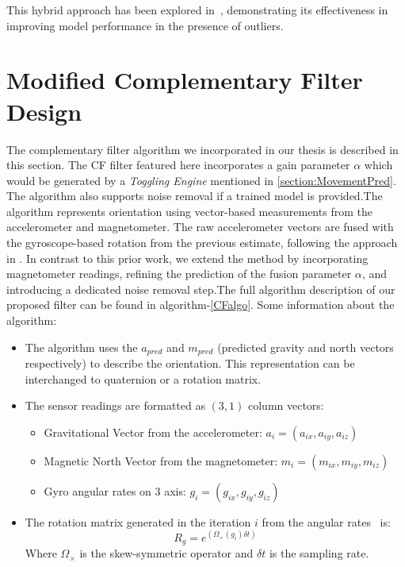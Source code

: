 \documentclass{iutbscthesis}
\begin{document}
This hybrid approach has been explored in~\cite{lopez2017ransac}, demonstrating its effectiveness in improving model performance in the presence of outliers.
    

\section{Modified Complementary Filter Design}
    The complementary filter algorithm we incorporated in our thesis is described in this section. The CF filter featured here incorporates a gain parameter $\alpha$ which would be generated by a \textit{Toggling Engine} mentioned in \autoref{section:MovementPred}. The algorithm also supports noise removal if a trained model is provided\cite{denoising}.The algorithm represents orientation using vector-based measurements from the accelerometer and magnetometer. The raw accelerometer vectors are fused with the gyroscope-based rotation from the previous estimate, following the approach in \cite{vertzberger2022adaptive}. In contrast to this prior work, we extend the method by incorporating magnetometer readings, refining the prediction of the fusion parameter $\alpha$, and introducing a dedicated noise removal step.The full algorithm description of our proposed filter can be found in algorithm-\ref{CFalgo}. Some information about the algorithm:
    \begin{itemize}
    \item The algorithm uses the $a_{pred}$ and $m_{pred}$ (predicted gravity and north vectors respectively) to describe the orientation. This representation can be interchanged to quaternion or a rotation matrix\cite{black1964passive}\cite{cariow2016hardware}.
    \item The sensor readings are formatted as $(3,1)$ column vectors:
    \begin{itemize}
        \item Gravitational Vector from the accelerometer: $a_i = (a_{ix},a_{iy},a_{iz})$
        \item Magnetic North Vector from the magnetometer: $m_i = (m_{ix},m_{iy},m_{iz})$
        \item Gyro angular rates on 3 axis: $g_i = (g_{ix},g_{iy},g_{iz})$
    \end{itemize}
    \item  The rotation matrix generated in the iteration $i$ from the angular rates~\cite{zhao2016time} is:
    \begin{equation}
        R_g = e^{(\Omega_{\times}(g_i)\delta t)}
    \end{equation}
    Where $\Omega_{\times}$ is the skew-symmetric operator and $\delta t$ is the sampling rate.
\end{itemize}
\end{document}

